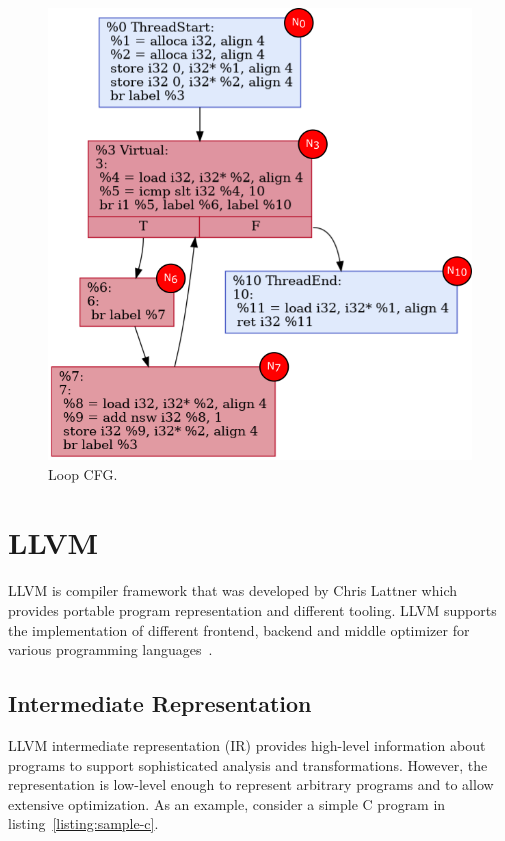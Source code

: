 \begin{figure}[htbp]
    \centerline{\includegraphics[scale=.70]{Figures/03/simple-loop-checkpoints.png}}
    \caption{Loop CFG.}
    \label{fig:simple-loop-checkpoints}
\end{figure}


\section{LLVM}
\label{sec:llvm}

LLVM is compiler framework that was developed by Chris Lattner which provides
portable program representation and different tooling. LLVM supports the
implementation of different frontend, backend and middle optimizer for various
programming languages~\cite{lattnerLLVMCompilationFramework2004a}. 

\subsection{Intermediate Representation}

LLVM intermediate representation (IR) provides high-level information about
programs to support sophisticated analysis and transformations. However, the
representation is low-level enough to represent arbitrary programs and to allow
extensive optimization. As an example, consider a simple C program in
listing~\ref{listing:sample-c}.

